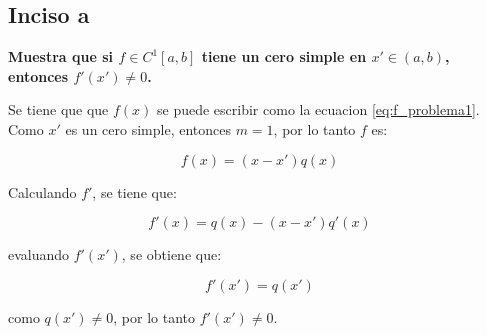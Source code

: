 \subsection*{Inciso a}

\textbf{Muestra que si $f\in C^1 [a,b]$ tiene un cero simple en $x'\in(a,b)$, entonces $f'(x')\neq 0$.}

Se tiene que que $f(x)$ se puede escribir como la ecuacion \ref{eq:f_problema1}. Como $x'$ es un cero simple, entonces $m=1$, por lo tanto $f$ es:

\begin{equation*}
    f(x)=(x-x')q(x)
\end{equation*}

Calculando $f'$, se tiene que:

\begin{equation*}
    f'(x)=q(x)-(x-x')q'(x)
\end{equation*}

evaluando $f'(x')$, se obtiene que:

\begin{equation*}
    f'(x') = q(x')
\end{equation*}

como $q(x')\neq 0$, por lo tanto $f'(x')\neq 0$.

